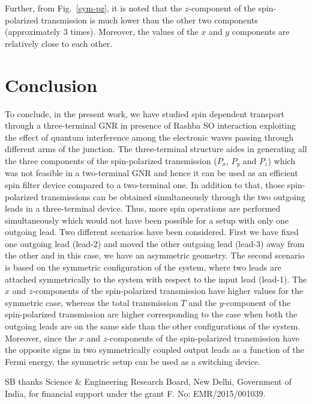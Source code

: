 \documentclass[prb,aps,twocolumn,amsmath,amssymb,floatfix,
superscriptaddress]{revtex4}
\begin{document}
Further, from Fig.~\ref{sym-pz}, it is noted that the $z$-component of
the spin-polarized transmission is much lower than the other two
components (approximately 3 times). Moreover, the values of the $x$
and $y$ components are relatively close to each other.


\section{{\label{conclusion}}Conclusion}
To conclude, in the present work, we have studied spin dependent
transport through a three-terminal GNR in presence of Rashba SO
interaction exploiting the effect of quantum interference among the
electronic waves passing through different arms of the
junction. The three-terminal structure aides in generating all the
  three components of the spin-polarized transmission ($P_x$, $P_y$
  and $P_z$) which was not feasible in a two-terminal GNR and hence it
  can be used as an efficient spin filter device compared to a
  two-terminal one. In addition to that, those spin-polarized
  transmissions can be obtained simultaneously through the two
  outgoing leads in a three-terminal device. Thus, more spin operations are performed simultaneously which would not have been possible for a setup with only one outgoing lead.
 Two different scenarios
have been considered. First we have fixed one outgoing lead (lead-2)
and moved the other outgoing lead (lead-3) away from the other and in
this case, we have an asymmetric geometry. The second scenario is
based on the symmetric configuration of the system, where two leads
are attached symmetrically to the system with respect to the input
lead (lead-1). The $x$ and $z$-components of the spin-polarized
transmission have higher values for the symmetric case, whereas the
total transmission $T$ and the $y$-component of the spin-polarized
transmission are higher corresponding to the case when both the
outgoing leads are on the same side than the other configurations of
the system. Moreover, since the $x$ and $z$-components of the
spin-polarized transmission have the opposite signs in two
symmetrically coupled output leads as a function of the Fermi energy,
the symmetric setup can be used as a switching device.


\acknowledgments

SB thanks Science \& Engineering Research Board, New Delhi, Government
of India, for financial support under the grant F. No:
EMR/2015/001039.
\end{document}

